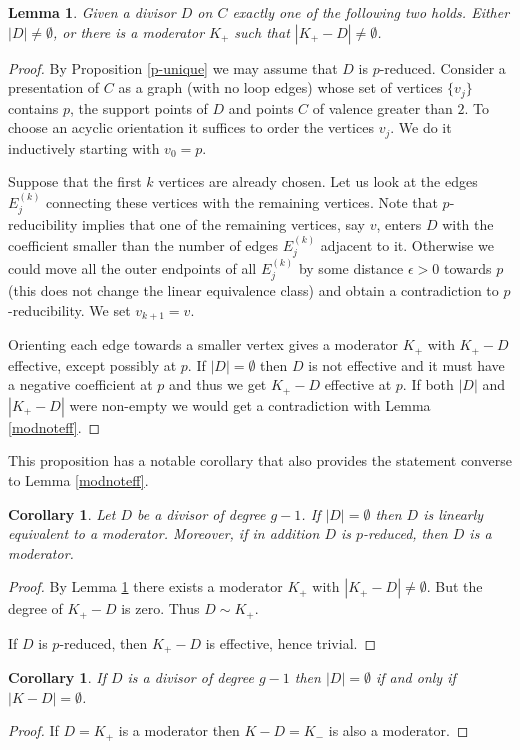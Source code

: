 \documentclass[12pt]{amsart}
\theoremstyle{plain}
\newtheorem{lemma}[theorem]{Lemma}
\newtheorem{corollary}[theorem]{Corollary}
\theoremstyle{definition}
\theoremstyle{remark}
\newcommand{\<}{\langle}   %
\renewcommand{\>}{\rangle} %
\begin{document}
\begin{lemma}\label{prop:rr}
Given a divisor $D$ on $C$ exactly one of the following two holds.
Either $|D|\ne\emptyset$, or there is a moderator $K_+$ such that $|K_+-D|\ne\emptyset$.
\end{lemma}
\begin{proof}
By Proposition \ref{p-unique} we may assume that $D$ is $p$-reduced.
Consider a presentation of $C$ as a graph (with no loop edges) whose set of vertices $\{v_j\}$
contains $p$, the support points
of $D$ and points $C$ of valence greater than $2$. To choose an acyclic
orientation it suffices to order the vertices $v_j$. We do it inductively
starting with $v_0=p$.

Suppose that the first $k$ vertices are already chosen. Let us look at the edges $E_j^{(k)}$
connecting these vertices with the remaining vertices.
Note that $p$-reducibility implies that one of the remaining vertices, say $v$, enters $D$
with the coefficient smaller than the number of edges $E_j^{(k)}$ adjacent to it.
Otherwise we could move all the outer endpoints of all $E_j^{(k)}$ by some distance $\epsilon>0$
towards $p$ (this does not change the linear equivalence class)
and obtain a contradiction to $p$-reducibility. We set $v_{k+1}=v$.

Orienting each edge towards a smaller vertex gives a moderator $K_+$ with $K_+-D$ effective,
except possibly at $p$. If  $|D|=\emptyset$ then $D$ is not effective and it must have a negative coefficient at $p$ and thus we get $K_+-D$ effective at $p$.
If both $|D|$ and $|K_+-D|$ were non-empty we would get a contradiction with Lemma \ref{modnoteff}.
\end{proof}

This proposition has a notable corollary that also provides
the statement converse to Lemma \ref{modnoteff}.
\begin{corollary}\label{moderators}
Let $D$ be a divisor of degree $g-1$. If $|D|=\emptyset$ then $D$ is linearly equivalent to a moderator. Moreover, if in addition $D$ is $p$-reduced, then $D$ is a moderator.
\end{corollary}
\begin{proof}
By Lemma \ref{prop:rr}
there exists a moderator $K_+$ with $|K_+-D|\ne\emptyset$.
But the degree of $K_+-D$ is zero. Thus $D \sim K_+$.

If $D$ is $p$-reduced, then $K_+-D$ is effective, hence trivial.
\end{proof}

\begin{corollary}\label{cor:rr}
If $D$ is a divisor of degree $g-1$ then
$|D|=\emptyset$ if and only if $|K-D|=\emptyset$.
\end{corollary}
\begin{proof}
If $D=K_+$ is a moderator then $K-D=K_-$ is also a moderator.
\end{proof}
\end{document}
